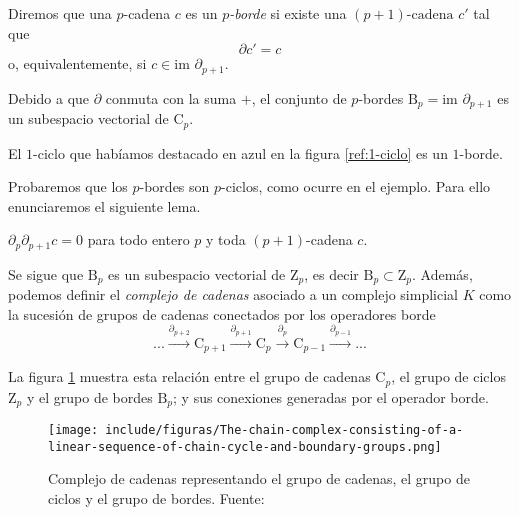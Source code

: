 \begin{definition}
\begin{sloppypar}
Diremos que una $p$-cadena $c$ es un \emph{$p$-borde} si existe una ${(p+1)\text{-cadena}}$ $c'$ tal que
\[
\partial c' = c
\]
o, equivalentemente, si $c \in \text{im }\partial_{p+1}$.
\end{sloppypar}
\end{definition}

Debido a que $\partial$ conmuta con la suma $+$, el conjunto de $p$-bordes $\text{B}_p = \text{im }\partial_{p+1}$ es un subespacio vectorial de $\text{C}_p$.

\begin{exmp}
El $1$-ciclo que habíamos destacado en azul en la figura \ref{ref:1-ciclo} es un $1$-borde.
\end{exmp}

Probaremos que los $p$-bordes son $p$-ciclos, como ocurre en el ejemplo. Para ello enunciaremos el siguiente lema.

\begin{lemma}
$\partial_p \partial_{p+1} c = 0$ para todo entero $p$ y toda $(p + 1)$-cadena $c$.
\end{lemma}

Se sigue que $\text{B}_p$ es un subespacio vectorial de $\text{Z}_p$, es decir $\text{B}_p \subset \text{Z}_p$. Además, podemos definir el \emph{complejo de cadenas} asociado a un complejo simplicial $K$ como la sucesión de grupos de cadenas conectados por los operadores borde
\[
...\overset{\partial_{p+2}}{\longrightarrow}\text{C}_{p+1}\overset{\partial_{p+1}}{\longrightarrow}\text{C}_{p}\overset{\partial_{p}}{\longrightarrow}\text{C}_{p-1}\overset{\partial_{p-1}}{\longrightarrow}...
\]

La figura \ref{ref:gruposCadenasOpBorde} muestra esta relación entre el grupo de cadenas $\text{C}_p$, el grupo de ciclos $\text{Z}_p$ y el grupo de bordes $\text{B}_p$; y sus conexiones generadas por el operador borde.

\begin{figure}[!ht]
\centering
\texttt{[image: include/figuras/The-chain-complex-consisting-of-a-linear-sequence-of-chain-cycle-and-boundary-groups.png]} 
\caption{Complejo de cadenas representando el grupo de cadenas, el grupo de ciclos y el grupo de bordes. Fuente: \cite{libroEH}}
\label{ref:gruposCadenasOpBorde}
\end{figure}


